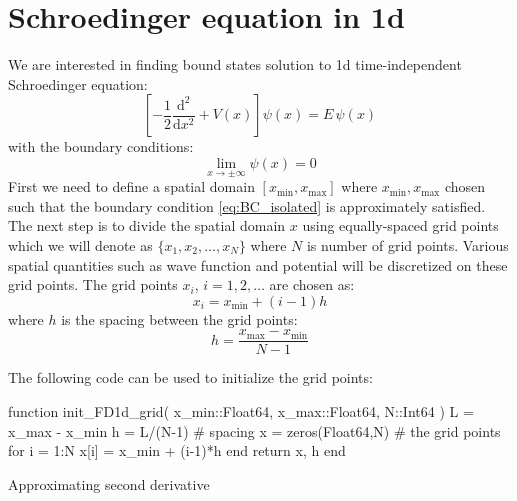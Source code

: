 \section{Schroedinger equation in 1d}

We are interested in finding bound states solution to 1d time-independent Schroedinger equation:
\begin{equation}
\left[ -\frac{1}{2}\frac{\mathrm{d}^2}{\mathrm{d}x^2} + V(x) \right] \psi(x) = E\, \psi(x)
\label{eq:Sch_1d_eq}
\end{equation}
%
with the boundary conditions:
%
\begin{equation}
\lim_{x \rightarrow \pm \infty} \psi(x) = 0
\label{eq:BC_isolated}
\end{equation}
%
First we need to define a spatial domain $\left[x_{\mathrm{min}}, x_{\mathrm{max}}\right]$
where $x_{\mathrm{min}}, x_{\mathrm{max}}$ chosen
such that the boundary condition \ref{eq:BC_isolated} is approximately satisfied.
The next step is to divide the spatial domain $x$ using equally-spaced grid points
which we will denote as $\{x_{1},x_{2},\ldots,x_{N}\}$ where $N$ is number
of grid points. Various spatial quantities such as wave function and potential will be discretized
on these grid points.
The grid points $x_{i}$, $i = 1, 2, \ldots$ are chosen as:
\begin{equation}
x_{i} = x_{\mathrm{min}} + (i-1)h
\end{equation}
where $h$ is the spacing between the grid points:
\begin{equation}
h = \frac{ x_{\mathrm{max}} - x_{\mathrm{min}} }{N-1}
\end{equation}

The following code can be used to initialize the grid points:
\begin{juliacode}
function init_FD1d_grid( x_min::Float64, x_max::Float64, N::Int64 )
    L = x_max - x_min
    h = L/(N-1) # spacing
    x = zeros(Float64,N) # the grid points
    for i = 1:N
        x[i] = x_min + (i-1)*h
    end
    return x, h
end
\end{juliacode}


Approximating second derivative

